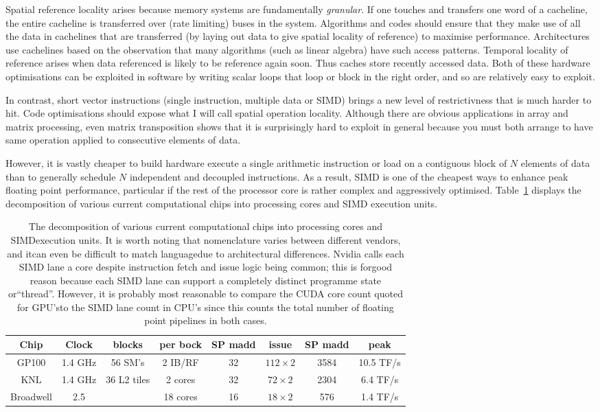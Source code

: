 \documentclass{PoS}
\begin{document}
Spatial reference locality arises because memory systems are fundamentally \emph{granular}. If one touches and transfers one word
of a cacheline, the entire cacheline is transferred over (rate limiting) buses in the system. Algorithms and codes should ensure that they 
make use of all the data in cachelines that are transferred (by laying out data to give spatial locality of reference) to maximise performance.
Architectures use cachelines based on the observation that many algorithms (such as linear algebra) have such access patterns.
%
Temporal locality of reference arises when data referenced is likely to be reference again soon. Thus caches store recently accessed
data.
%
Both of these hardware optimisations can be exploited in software by writing scalar loops that loop or block in the right order, and so are
relatively easy to exploit. 

In contrast, short vector instructions (single instruction, multiple data or SIMD) brings a new level of restrictivness 
that is much harder to hit. Code optimisations should expose what I will call spatial operation locality.
Although there are obvious applications in array and matrix processing, even matrix transposition shows that it is surprisingly hard to exploit 
in general because you must both arrange to have same operation applied to consecutive elements of data.

However, it is vastly cheaper to build hardware execute a single arithmetic instruction or load on a contiguous block of $N$ elements of data than to generally
schedule $N$ independent and decoupled instructions. As a result, SIMD is one of the cheapest ways to enhance peak floating point performance,
particular if the rest of the processor core is rather complex and aggressively optimised. Table~\ref{tab:simd} displays the decomposition of various
current computational chips into processing cores and SIMD execution units.

\begin{table}[hbt]
\begin{tabular}{c|c|c|c|c|c|c|c}
Chip & Clock & blocks & per bock  & SP madd    & issue           & SP madd & peak\\
\hline
GP100 & 1.4 GHz &  56 SM's     & 2 IB/RF & 32 & $112 \times 2$  & 3584 & 10.5 TF/s\\
KNL   &1.4 GHz &  36 L2 tiles  & 2 cores & 32 & $72\times 2$    & 2304 & 6.4 TF/s\\
Broadwell & 2.5 &  & 18 cores & 16 & $18\times 2$   & 576  & 1.4 TF/s
\end{tabular}
\caption{\label{tab:simd}
The decomposition of various
current computational chips into processing cores and SIMDexecution units. It is worth noting that nomenclature varies between different
vendors, and itcan even be difficult to match languagedue to architectural differences. Nvidia calls each SIMD lane a core despite instruction
fetch and issue logic being common; this is forgood reason because each SIMD lane can support a completely distinct programme state or``thread''.
However, it is probably most reasonable to compare the CUDA core count quoted for GPU'sto the SIMD lane count in CPU's since this counts the total
number of floating point pipelines in both cases.
 }
\end{table}
\end{document}

